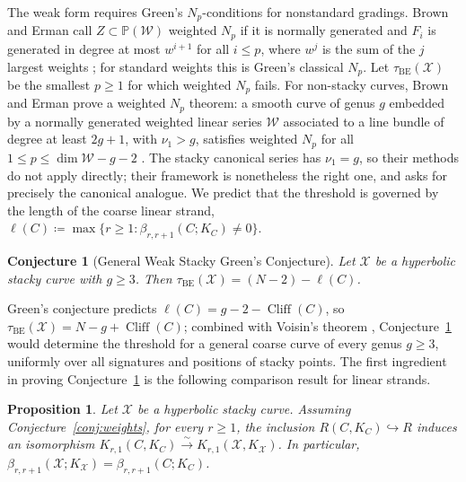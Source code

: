 \documentclass[11pt,reqno]{amsart}
\newtheorem{prop}[lemma]{Proposition}
\newtheorem{conjecture}[lemma]{Conjecture}
\theoremstyle{remark}
\newcommand{\defi}[1]{\textsf{#1}} %
\newcommand{\cliff}{\operatorname{Cliff}}
\newcommand{\BE}{\operatorname{BE}}
\newcommand{\PP}{\mathbb{P}}
\newcommand{\cW}{\mathcal{W}}
\newcommand{\cX}{\mathcal{X}}
\begin{document}
The weak form requires Green's $N_p$-conditions for nonstandard gradings. Brown and Erman call $Z\subset\PP(\cW)$ \defi{weighted $N_p$} if it is normally generated and $F_i$ is generated in degree at most $w^{i+1}$ for all $i\leq p$, where $w^j$ is the sum of the $j$ largest weights \cite[Def.~1.2]{brownErman25}; for standard weights this is Green's classical $N_p$. Let $\tau_{\BE}(\cX)$ be the smallest $p\geq1$ for which weighted $N_p$ fails. For non-stacky curves, Brown and Erman prove a weighted $N_p$ theorem: a smooth curve of genus $g$ embedded by a normally generated weighted linear series $\cW$ associated to a line bundle of degree at least $2g+1$, with $\nu_1>g$, satisfies weighted $N_p$ for all $1\leq p\leq \dim\cW-g-2$ \cite[Thm.~1.7]{brownErman25}. The stacky canonical series has $\nu_1=g$, so their methods do not apply directly; their framework is nonetheless the right one, and \cite[Question 7.7]{brownErman25} asks for precisely the canonical analogue. We predict that the threshold is governed by the length of the coarse linear strand, $\ell(C)\coloneqq\max\{r\geq1:\beta_{r,r+1}(C;K_C)\neq0\}$.

\begin{conjecture}[General Weak Stacky Green's Conjecture]\label{con:WSGC}
Let $\cX$ be a hyperbolic stacky curve with $g\geq3$. Then $\tau_{\BE}(\cX)=(N-2)-\ell(C)$.
\end{conjecture}

Green's conjecture predicts $\ell(C)=g-2-\cliff(C)$, so $\tau_{\BE}(\cX)=N-g+\cliff(C)$; combined with Voisin's theorem \cite{voisin02,voisin05}, Conjecture~\ref{con:WSGC} would determine the threshold for a general coarse curve of every genus $g\geq3$, uniformly over all signatures and positions of stacky points. The first ingredient in proving Conjecture~\ref{con:WSGC} is the following comparison result for linear strands.



\begin{prop}\label{prop:linear-strand} 
Let $\cX$ be a hyperbolic stacky curve. Assuming Conjecture~\ref{conj:weights}, for every $r\geq1$, the inclusion $R(C,K_C)\hookrightarrow R$ induces an isomorphism $K_{r,1}(C,K_C)\xrightarrow{\ \sim\ }K_{r,1}(\cX,K_{\cX})$.
In particular, $\beta_{r,r+1}(\cX;K_{\cX})=\beta_{r,r+1}(C;K_C)$.
\end{prop}
\end{document}
